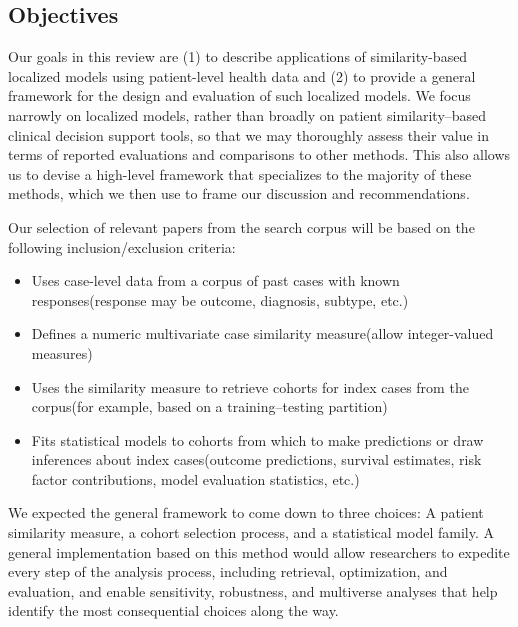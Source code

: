 \documentclass{article}
\providecommand{\tightlist}{%
  \setlength{\itemsep}{0pt}\setlength{\parskip}{0pt}}
\begin{document}
\hypertarget{objectives}{%
\subsection{Objectives}\label{objectives}}

Our goals in this review are (1) to describe applications of
similarity-based localized models using patient-level health data and
(2) to provide a general framework for the design and evaluation of such
localized models. We focus narrowly on localized models, rather than
broadly on patient similarity--based clinical decision support tools, so
that we may thoroughly assess their value in terms of reported
evaluations and comparisons to other methods. This also allows us to
devise a high-level framework that specializes to the majority of these
methods, which we then use to frame our discussion and recommendations.

Our selection of relevant papers from the search corpus will be based on
the following inclusion/exclusion criteria:

\begin{itemize}
\tightlist
\item
  Uses case-level data from a corpus of past cases with known
  responses\newline (response may be outcome, diagnosis, subtype, etc.)
\item
  Defines a numeric multivariate case similarity measure\newline (allow
  integer-valued measures)
\item
  Uses the similarity measure to retrieve cohorts for index cases from
  the corpus\newline (for example, based on a training--testing
  partition)
\item
  Fits statistical models to cohorts from which to make predictions or
  draw inferences about index cases\newline (outcome predictions,
  survival estimates, risk factor contributions, model evaluation
  statistics, etc.)
\end{itemize}

We expected the general framework to come down to three choices: A
patient similarity measure, a cohort selection process, and a
statistical model family. A general implementation based on this method
would allow researchers to expedite every step of the analysis process,
including retrieval, optimization, and evaluation, and enable
sensitivity, robustness, and multiverse analyses that help identify the
most consequential choices along the way.
\end{document}
